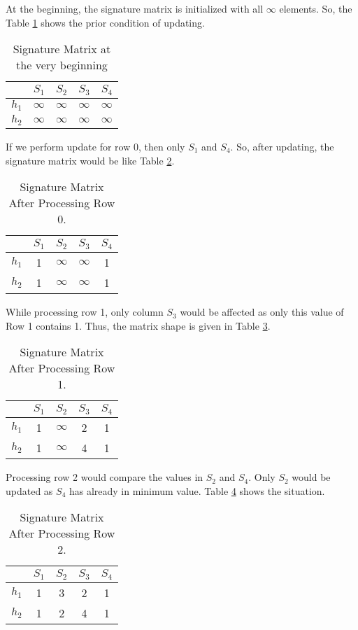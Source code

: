 \documentclass{standalone}
\begin{document}
At the beginning, the signature matrix is initialized with all $\infty$ elements. So, the Table \ref{tab:minhash1} shows the prior condition of updating.
\begin{table}[ht]
\centering
\caption{Signature Matrix at the very beginning}
\label{tab:minhash1}
\begin{tabular}{l||l|l|l|l}
   & $S_1$ & $S_2$ & $S_3$ & $S_4$ \\ \hline 
$h_1$ &  $\infty$  &  $\infty$  &  $\infty$  & $\infty$   \\
$h_2$ & $\infty$   & $\infty$   & $\infty$   & $\infty$  
\end{tabular}
\end{table}

If we perform update for row 0, then only $S_1$ and $S_4$. So, after updating, the signature matrix would be like Table \ref{tab:minhash2}.
\begin{table}[ht]
\centering
\caption{Signature Matrix After Processing Row 0.}
\label{tab:minhash2}
\begin{tabular}{c||c|c|c|c}
   & $S_1$ & $S_2$ & $S_3$ & $S_4$ \\ \hline 
$h_1$ &  \cellcolor[HTML]{FD6864}1  &  $\infty$  &  $\infty$  & \cellcolor[HTML]{FD6864}1   \\
$h_2$ & \cellcolor[HTML]{FD6864}1   & $\infty$   & $\infty$   & \cellcolor[HTML]{FD6864}1 
\end{tabular}
\end{table}

While processing row 1, only column $S_3$ would be affected as only this value of Row 1 contains 1. Thus, the matrix shape is given in Table \ref{tab:minhash3}.
\begin{table}[ht]
\centering
\caption{Signature Matrix After Processing Row 1.}
\label{tab:minhash3}
\begin{tabular}{c||c|c|c|c}
   & $S_1$ & $S_2$ & $S_3$ & $S_4$ \\ \hline 
$h_1$ &  1  &  $\infty$  &  \cellcolor[HTML]{FD6864}2  & 1   \\
$h_2$ & 1   & $\infty$   & \cellcolor[HTML]{FD6864}4   & 1 
\end{tabular}
\end{table}

Processing row 2 would compare the values in $S_2$ and $S_4$. Only $S_2$ would be updated as $S_4$ has already in minimum value. Table \ref{tab:minhash4} shows the situation.
\begin{table}[ht]
\centering
\caption{Signature Matrix After Processing Row 2.}
\label{tab:minhash4}
\begin{tabular}{c||c|c|c|c}
   & $S_1$ & $S_2$ & $S_3$ & $S_4$ \\ \hline 
$h_1$ &  1  &  \cellcolor[HTML]{FD6864}3  &  2  & \cellcolor[HTML]{FFCE93}1   \\
$h_2$ & 1   & \cellcolor[HTML]{FD6864}2   & 4   & \cellcolor[HTML]{FFCE93}1 
\end{tabular}
\end{table}
\end{document}
